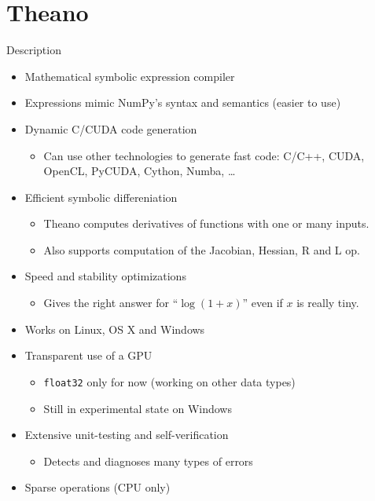 \documentclass[utf8x,xcolor=pdftex,dvipsnames,table]{beamer}
\begin{document}
\section{Theano}
\begin{frame}{Description}
  \begin{itemize}
    \item Mathematical symbolic expression compiler
    \item Expressions mimic NumPy's syntax and semantics (easier to use)
    \item Dynamic C/CUDA code generation
    \begin{itemize}
      \item Can use other technologies to generate fast code: C/C++, CUDA, OpenCL, PyCUDA, Cython, Numba, \ldots
    \end{itemize}
    \item Efficient symbolic differeniation
    \begin{itemize}
      \item Theano computes derivatives of functions with one or many inputs.
      \item Also supports computation of the Jacobian, Hessian, R and L op.
    \end{itemize}
    \item Speed and stability optimizations
    \begin{itemize}
      \item Gives the right answer for ``$\log (1 + x)$'' even if $x$ is really tiny.
    \end{itemize}
    \item Works on Linux, OS X and Windows
    \item Transparent use of a GPU
    \begin{itemize}
      \item {\tt float32} only for now (working on other data types)
      \item Still in experimental state on Windows
    \end{itemize}

    \item Extensive unit-testing and self-verification
    \begin{itemize}
      \item Detects and diagnoses many types of errors
    \end{itemize}

    \item Sparse operations (CPU only)
  \end{itemize}
\end{frame}
\end{document}
